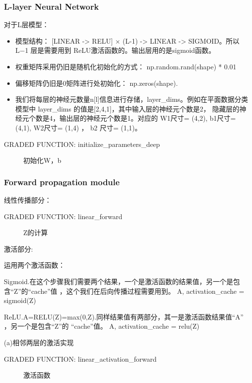 \documentclass[UTF8]{ctexart}
\begin{document}
\subsubsection{L-layer Neural Network}
对于L层模型：
\begin{itemize}
  \item 模型结构： [LINEAR -> RELU] × (L-1) -> LINEAR -> SIGMOID。所以 L−1 层是需要用到 ReLU激活函数的。输出层用的是sigmoid函数。
\item 权重矩阵采用仍旧是随机化初始化的方式： np.random.rand(shape) * 0.01
\item 偏移矩阵仍旧是0矩阵进行处初始化： np.zeros(shape).
\item 我们将每层的神经元数量n[l]信息进行存储，layer\_dims。例如在平面数据分类模型中 layer\_dims 的值是[2,4,1]，其中输入层的神经元个数是2，
  隐藏层的神经元个数是4，输出层的神经元个数是1。对应的 W1尺寸= (4,2), b1尺寸= (4,1), W2尺寸= (1,4) ， b2 尺寸= (1,1)。
\end{itemize}

GRADED FUNCTION: initialize\_parameters\_deep
\begin{figure}[htb]
 \caption{初始化W，b}
 \label{fig:2}
 \end{figure}

\subsubsection{Forward propagation module}
线性传播部分：

GRADED FUNCTION: linear\_forward
 \begin{figure}[htb]
  \caption{Z的计算}
  \label{fig:3}
  \end{figure}

激活部分:

运用两个激活函数：

Sigmoid.在这个步骤我们需要两个结果，一个是激活函数的结果值，另一个是包含``Z''的``cache''值 ，这个我们在后向传播过程需要用到。
     A, activation\_cache = sigmoid(Z)

ReLU.A=RELU(Z)=max(0,Z).同样结果值有两部分，其一是激活函数结果值``A'' ，另一个是包含``Z''的 ``cache''值。
   A, activation\_cache = relu(Z)

(a)相邻两层的激活实现

GRADED FUNCTION: linear\_activation\_forward
   \begin{figure}[htb]
    \caption{激活函数}
    \label{fig:4}
    \end{figure}
\end{document}
